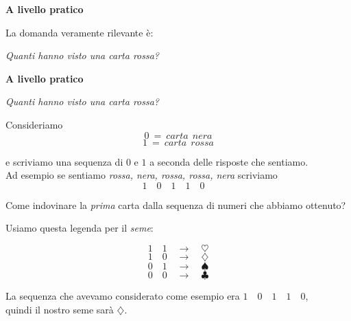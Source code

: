 \documentclass[8pt]{beamer}
\theoremstyle{plain}
\theoremstyle{definition}
\begin{document}
\begin{frame}
\begin{center}
\textbf{A livello pratico}

\bigskip
\bigskip

La domanda veramente rilevante è:

\smallskip

\textit{Quanti hanno visto una carta rossa?}

\end{center}
\end{frame}



\begin{frame}
\begin{center}
\textbf{A livello pratico}

\bigskip
\bigskip


\textit{Quanti hanno visto una carta rossa?}

\bigskip

Consideriamo $$0\: = \: carta \:\: nera$$ $$ 1\: = \: carta \:\: rossa$$

\smallskip

e scriviamo una sequenza di $0$ e $1$ a seconda delle risposte che sentiamo.
\\Ad esempio se sentiamo \textit{rossa, nera, rossa, rossa, nera} scriviamo  $$1\quad 0\quad 1\quad 1\quad 0\quad$$
\end{center}
\end{frame}



\begin{frame}
\begin{center}
Come indovinare la \textit{prima} carta dalla sequenza di numeri che abbiamo ottenuto?

\bigskip

\end{center}
\end{frame}

\begin{frame}
\begin{center}
Usiamo questa legenda per il \textit{seme}:

\bigskip

$$ 1\quad 1 \quad\rightarrow\quad \heartsuit$$ $$ 1\quad 0 \quad\rightarrow\quad \diamondsuit$$ $$ 0\quad 1 \quad\rightarrow\quad \spadesuit$$ $$ 0\quad 0 \quad\rightarrow\quad \clubsuit$$

\bigskip
\bigskip

La sequenza che avevamo considerato come esempio era $1 \quad 0 \quad 1 \quad 1 \quad 0$, \\quindi il nostro seme sarà $\diamondsuit$.

\end{center}
\end{frame}
\end{document}
